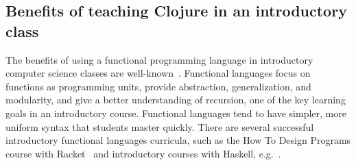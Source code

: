 \documentclass[submission,copyright,creativecommons]{eptcs}
\newcommand{\allcomments}[1]{{#1}}
\newcommand{\elenacomment}[1]{{\bf \textcolor{ForestGreen}{\allcomments{{#1}}}}}
\newcommand{\stephencomment}[1]{{\bf \color{StephensBlue}{\allcomments{{#1}}}}} %
\newcommand{\todo}[1]{{\bf \color{magenta}{\allcomments{ To-do: {#1}}}}}
\begin{document}

\subsection{Benefits of teaching Clojure in an introductory class}
The benefits of using a functional programming language in introductory computer science classes are well-known~\cite{thomsonEducation}. Functional languages focus on functions as programming units, provide abstraction, generalization, and modularity, and give a better understanding of recursion, one of the key learning goals in an introductory course. 
Functional languages tend to have simpler, more uniform syntax that students master quickly. There are several successful introductory functional languages curricula, such as the How To Design Programs course with %
 Racket~\cite{htdp} and introductory courses with Haskell, e.g.~\cite{haskell}.

\end{document}

